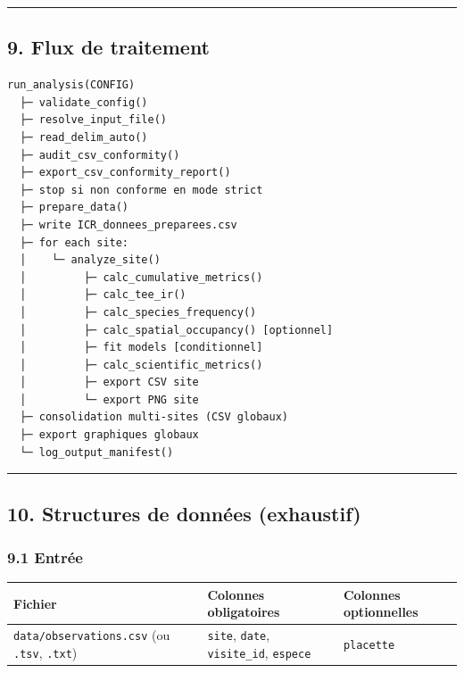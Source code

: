 \begin{center}\rule{0.5\linewidth}{0.5pt}\end{center}

\subsection{9. Flux de traitement}\label{flux-de-traitement}

\begin{verbatim}
run_analysis(CONFIG)
  ├─ validate_config()
  ├─ resolve_input_file()
  ├─ read_delim_auto()
  ├─ audit_csv_conformity()
  ├─ export_csv_conformity_report()
  ├─ stop si non conforme en mode strict
  ├─ prepare_data()
  ├─ write ICR_donnees_preparees.csv
  ├─ for each site:
  │    └─ analyze_site()
  │         ├─ calc_cumulative_metrics()
  │         ├─ calc_tee_ir()
  │         ├─ calc_species_frequency()
  │         ├─ calc_spatial_occupancy() [optionnel]
  │         ├─ fit models [conditionnel]
  │         ├─ calc_scientific_metrics()
  │         ├─ export CSV site
  │         └─ export PNG site
  ├─ consolidation multi-sites (CSV globaux)
  ├─ export graphiques globaux
  └─ log_output_manifest()
\end{verbatim}

\begin{center}\rule{0.5\linewidth}{0.5pt}\end{center}

\subsection{10. Structures de données
(exhaustif)}\label{structures-de-donnuxe9es-exhaustif}

\subsubsection{9.1 Entrée}\label{entruxe9e}

{\def\LTcaptype{none} %
\begin{longtable}[]{@{}
  >{\raggedright\arraybackslash}p{}
  >{\raggedright\arraybackslash}p{}
  >{\raggedright\arraybackslash}p{}@{}}
\toprule\noalign{}
\begin{minipage}[b]{\linewidth}\raggedright
Fichier
\end{minipage} & \begin{minipage}[b]{\linewidth}\raggedright
Colonnes obligatoires
\end{minipage} & \begin{minipage}[b]{\linewidth}\raggedright
Colonnes optionnelles
\end{minipage} \\
\midrule\noalign{}
\endhead
\bottomrule\noalign{}
\endlastfoot
\texttt{data/observations.csv} (ou \texttt{.tsv}, \texttt{.txt}) &
\texttt{site}, \texttt{date}, \texttt{visite\_id}, \texttt{espece} &
\texttt{placette} \\
\end{longtable}
}

